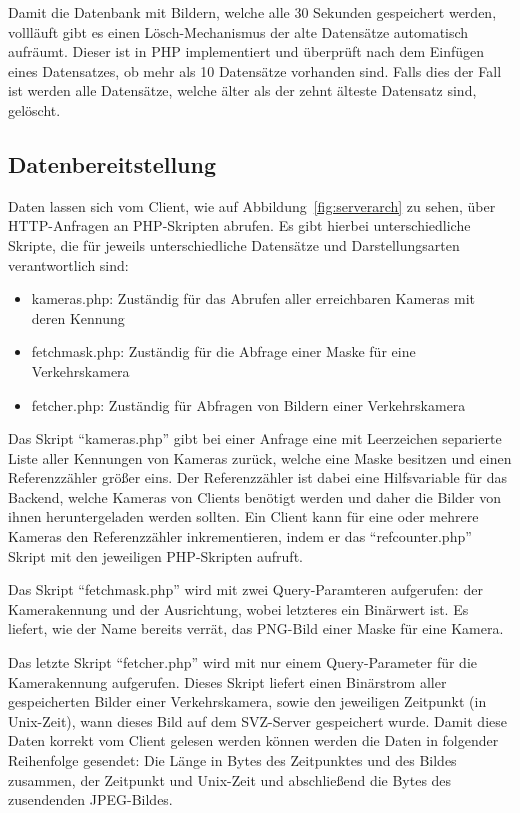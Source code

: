 Damit die Datenbank mit Bildern, welche alle 30 Sekunden gespeichert werden, vollläuft gibt es einen Lösch-Mechanismus der alte Datensätze automatisch aufräumt. 
Dieser ist in PHP implementiert und überprüft nach dem Einfügen eines Datensatzes, ob mehr als 10 Datensätze vorhanden sind.
Falls dies der Fall ist werden alle Datensätze, welche älter als der zehnt älteste Datensatz sind, gelöscht.
\newpage

\subsection{Datenbereitstellung}
Daten lassen sich vom Client, wie auf Abbildung~\ref{fig:serverarch} zu sehen, über HTTP-Anfragen an PHP-Skripten abrufen. Es gibt hierbei unterschiedliche Skripte, die für jeweils unterschiedliche Datensätze und Darstellungsarten verantwortlich sind:
\begin{itemize}
\item{kameras.php: Zuständig für das Abrufen aller erreichbaren Kameras mit deren Kennung}
\item{fetchmask.php: Zuständig für die Abfrage einer Maske für eine Verkehrskamera}
\item{fetcher.php: Zuständig für Abfragen von Bildern einer Verkehrskamera}
\end{itemize}
Das Skript "`kameras.php"' gibt bei einer Anfrage eine mit Leerzeichen separierte Liste aller Kennungen von Kameras zurück, welche eine Maske besitzen und einen Referenzzähler größer eins. 
Der Referenzzähler ist dabei eine Hilfsvariable für das Backend, welche Kameras von Clients benötigt werden und daher die Bilder von ihnen heruntergeladen werden sollten.
Ein Client kann für eine oder mehrere Kameras den Referenzzähler inkrementieren, indem er das "`refcounter.php"' Skript mit den jeweiligen PHP-Skripten aufruft.

Das Skript "`fetchmask.php"' wird mit zwei Query-Paramteren aufgerufen: der Kamerakennung und der Ausrichtung, wobei letzteres ein Binärwert ist. 
Es liefert, wie der Name bereits verrät, das PNG-Bild einer Maske für eine Kamera.

Das letzte Skript "`fetcher.php"' wird mit nur einem Query-Parameter für die Kamerakennung aufgerufen. 
Dieses Skript liefert einen Binärstrom aller gespeicherten Bilder einer Verkehrskamera, sowie den jeweiligen Zeitpunkt (in Unix-Zeit), wann dieses Bild auf dem SVZ-Server gespeichert wurde. 
Damit diese Daten korrekt vom Client gelesen werden können werden die Daten in folgender Reihenfolge gesendet: Die Länge in Bytes des Zeitpunktes und des Bildes zusammen, der Zeitpunkt und Unix-Zeit und abschließend die Bytes des zusendenden JPEG-Bildes.
\newpage

